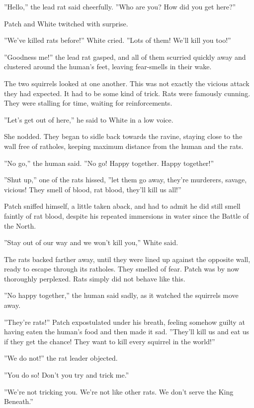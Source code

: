 \documentclass[12pt]{book}
\begin{document}
 ''Hello,'' the lead rat said cheerfully. ''Who are you? How did you get here?''\par
 Patch and White twitched with surprise.\par
 ''We've killed rats before!'' White cried. ''Lots of them! We'll kill you too!''\par
 ''Goodness me!'' the lead rat gasped, and all of them scurried quickly away and clustered around the human's feet, leaving fear-smells in their wake.\par
 The two squirrels looked at one another. This was not exactly the vicious attack they had expected. It had to be some kind of trick. Rats were famously cunning. They were stalling for time, waiting for reinforcements.\par
 ''Let's get out of here,'' he said to White in a low voice.\par
 She nodded. They began to sidle back towards the ravine, staying close to the wall free of ratholes, keeping maximum distance from the human and the rats.\par
 ''No go,'' the human said. ''No go! Happy together. Happy together!''\par
 ''Shut up,'' one of the rats hissed, ''let them go away, they're murderers, savage, vicious! They smell of blood, rat blood, they'll kill us all!''\par
 Patch sniffed himself, a little taken aback, and had to admit he did still smell faintly of rat blood, despite his repeated immersions in water since the Battle of the North.\par
 ''Stay out of our way and we won't kill you,'' White said.\par
 The rats backed farther away, until they were lined up against the opposite wall, ready to escape through its ratholes. They smelled of fear. Patch was by now thoroughly perplexed. Rats simply did not behave like this.\par
 ''No happy together,'' the human said sadly, as it watched the squirrels move away.\par
 ''They're rats!'' Patch expostulated under his breath, feeling somehow guilty at having eaten the human's food and then made it sad. ''They'll kill us and eat us if they get the chance! They want to kill every squirrel in the world!''\par
 ''We do not!'' the rat leader objected.\par
 ''You do so! Don't you try and trick me.''\par
 ''We're not tricking you. We're not like other rats. We don't serve the King Beneath.''\par
\end{document}
